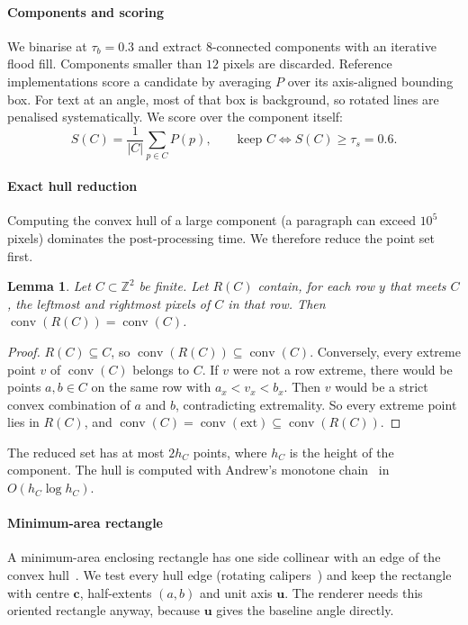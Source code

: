 \documentclass[journal]{IEEEtran}
\newtheorem{lemma}{Lemma}
\theoremstyle{definition}
\begin{document}
\paragraph{Components and scoring}
We binarise at $\tau_b=0.3$ and extract 8-connected components with an
iterative flood fill. Components smaller than $12$ pixels are discarded.
Reference implementations score a candidate by averaging $P$ over its
axis-aligned bounding box. For text at an angle, most of that box is
background, so rotated lines are penalised systematically. We score over the
component itself:
\begin{equation}
  S(C)=\frac{1}{|C|}\sum_{p\in C}P(p),\qquad \text{keep } C \iff S(C)\ge\tau_s=0.6 .
\end{equation}

\paragraph{Exact hull reduction}
Computing the convex hull of a large component (a paragraph can exceed $10^5$
pixels) dominates the post-processing time. We therefore reduce the point set
first.
\begin{lemma}\label{lem:rows}
Let $C\subset\mathbb{Z}^2$ be finite. Let $R(C)$ contain, for each row $y$ that
meets $C$, the leftmost and rightmost pixels of $C$ in that row. Then
$\operatorname{conv}(R(C))=\operatorname{conv}(C)$.
\end{lemma}
\begin{proof}
$R(C)\subseteq C$, so $\operatorname{conv}(R(C))\subseteq\operatorname{conv}(C)$.
Conversely, every extreme point $v$ of $\operatorname{conv}(C)$ belongs to $C$.
If $v$ were not a row extreme, there would be points $a,b\in C$ on the same row
with $a_x<v_x<b_x$. Then $v$ would be a strict convex combination of $a$ and
$b$, contradicting extremality. So every extreme point lies in $R(C)$, and
$\operatorname{conv}(C)=\operatorname{conv}(\mathrm{ext})\subseteq
\operatorname{conv}(R(C))$.
\end{proof}
The reduced set has at most $2h_C$ points, where $h_C$ is the height of the
component. The hull is computed with Andrew's monotone chain~\cite{andrew1979hull}
in $O(h_C\log h_C)$.

\paragraph{Minimum-area rectangle}
A minimum-area enclosing rectangle has one side collinear with an edge of the
convex hull~\cite{freeman1975rect}. We test every hull edge (rotating
calipers~\cite{toussaint1983calipers}) and keep the rectangle with centre
$\mathbf{c}$, half-extents $(a,b)$ and unit axis $\mathbf{u}$. The renderer
needs this oriented rectangle anyway, because $\mathbf{u}$ gives the baseline
angle directly.
\end{document}
